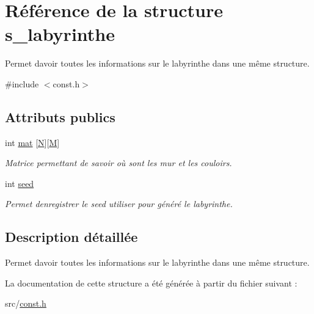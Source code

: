 \hypertarget{structs__labyrinthe}{}\section{Référence de la structure s\+\_\+labyrinthe}
\label{structs__labyrinthe}


Permet d\textquotesingle{}avoir toutes les informations sur le labyrinthe dans une même structure.  




{\ttfamily \#include $<$const.\+h$>$}

\subsection*{Attributs publics}
\begin{DoxyCompactItemize}
\item 
\mbox{\label{structs__labyrinthe_a38c27a2ce91e9ce3d16ee476ab6af783}} 
int \hyperlink{structs__labyrinthe_a38c27a2ce91e9ce3d16ee476ab6af783}{mat} \mbox{[}\hyperlink{const_8h_a0240ac851181b84ac374872dc5434ee4}{N}\mbox{]}\mbox{[}\hyperlink{const_8h_a52037c938e3c1b126c6277da5ca689d0}{M}\mbox{]}
\begin{DoxyCompactList}\small\item\em Matrice permettant de savoir où sont les mur et les couloirs. \end{DoxyCompactList}\item 
\mbox{\label{structs__labyrinthe_ab36d8b5e360862071eebf05b673b63e6}} 
int \hyperlink{structs__labyrinthe_ab36d8b5e360862071eebf05b673b63e6}{seed}
\begin{DoxyCompactList}\small\item\em Permet d\textquotesingle{}enregistrer le seed utiliser pour généré le labyrinthe. \end{DoxyCompactList}\end{DoxyCompactItemize}


\subsection{Description détaillée}
Permet d\textquotesingle{}avoir toutes les informations sur le labyrinthe dans une même structure. 

La documentation de cette structure a été générée à partir du fichier suivant \+:\begin{DoxyCompactItemize}
\item 
src/\hyperlink{const_8h}{const.\+h}\end{DoxyCompactItemize}
